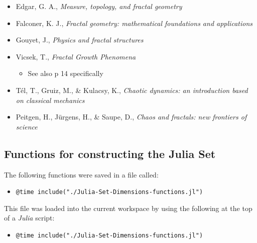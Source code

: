 \documentclass[a4paper,11pt,twoside]{article}
\begin{document}
\begin{itemize}
\item Edgar, G. A., \emph{Measure, topology, and fractal geometry} \cite[Ch. 6]{edgarMeasureTopologyFractal2008a}
\item Falconer, K. J., \emph{Fractal geometry: mathematical foundations and applications}  \cite[Ch. 2]{falconerFractalGeometryMathematical2003b}
\item Gouyet, J., \emph{Physics and fractal structures} \cite[\S1.3]{gouyetPhysicsFractalStructures1996}
\item Vicsek, T., \emph{Fractal Growth Phenomena} \cite[Ch. 4]{vicsekFractalGrowthPhenomena1992}
\begin{itemize}
\item See also p 14 specifically
\end{itemize}
\item Tél, T., Gruiz, M., \& Kulacsy, K., \emph{Chaotic dynamics: an introduction based on classical mechanics}  \cite[\S2.1.2]{telChaoticDynamicsIntroduction2006}
\item Peitgen, H., Jürgens, H., \& Saupe, D., \emph{Chaos and fractals: new frontiers of science}  \cite[\S 4.3]{peitgenChaosFractalsNew2004}
\end{itemize}

\subsection{Functions for constructing the Julia Set}
\label{julia-set-functions-script}
The following functions were saved in a file called:

\begin{itemize}
\item \texttt{@time include("./Julia-Set-Dimensions-functions.jl")}
\end{itemize}

This file was loaded into the current workspace by using the following at the top of a \emph{Julia} script:

\begin{itemize}
\item \texttt{@time include("./Julia-Set-Dimensions-functions.jl")}
\end{itemize}
\end{document}
